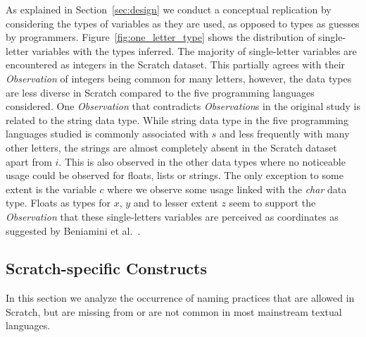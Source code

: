 \documentclass[conference]{IEEEtran}
\begin{document}
As explained in Section~\ref{sec:design} we conduct a conceptual replication by considering the types of variables as they are used, as opposed to types as guesses by programmers.
Figure~\ref{fig:one_letter_type} shows the distribution of single-letter variables with the types inferred. 
The majority of single-letter variables are encountered as integers in the Scratch dataset. This partially agrees with their \emph{Observation} of integers being common for many letters, however, the data types  are less diverse in Scratch compared to the five programming languages considered.
One \emph{Observation} that contradicts \emph{Observation}s in the original study is related to the string data type. While string data type in the five programming languages studied is commonly associated with $s$ and less frequently with many other letters, the strings are almost completely absent in the Scratch dataset apart from $i$. This is also observed in the other data types where no noticeable usage could be observed for floats, lists or strings. The only exception to some extent is the variable $c$ where we observe some usage linked with the \emph{char} data type. 
Floats as types for $x$, $y$ and to lesser extent $z$ seem to support the \emph{Observation} that these single-letters variables are perceived as coordinates as suggested by Beniamini et al.~\cite{Beniamini}.

\subsection{Scratch-specific Constructs}
\label{res:Scratch:specific}
In this section we analyze the occurrence of naming practices that are allowed in Scratch, but are missing from or are not common in most mainstream textual languages.
\end{document}
